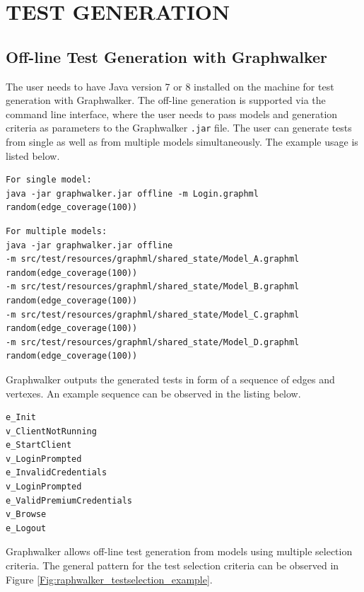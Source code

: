 \chapter{TEST GENERATION}
\label{chapter:test_generation}

\section{Off-line Test Generation with Graphwalker}
\par
The user needs to have Java version 7 or 8 installed on the machine for test generation with Graphwalker. The off-line generation is supported via the command line interface, where the user needs to pass models and generation criteria as parameters to the Graphwalker \texttt{.jar} file. The user can generate tests from single as well as from multiple models simultaneously. The example usage is listed below.

\begin{lstlisting}
For single model:
java -jar graphwalker.jar offline -m Login.graphml random(edge_coverage(100))
\end{lstlisting}
\begin{lstlisting}
For multiple models:
java -jar graphwalker.jar offline 
-m src/test/resources/graphml/shared_state/Model_A.graphml random(edge_coverage(100)) 
-m src/test/resources/graphml/shared_state/Model_B.graphml random(edge_coverage(100))
-m src/test/resources/graphml/shared_state/Model_C.graphml random(edge_coverage(100))
-m src/test/resources/graphml/shared_state/Model_D.graphml random(edge_coverage(100))
\end{lstlisting}

\par
Graphwalker outputs the generated tests in form of a sequence of edges and vertexes. An example sequence can be observed in the listing below.

\begin{lstlisting}
e_Init
v_ClientNotRunning
e_StartClient
v_LoginPrompted
e_InvalidCredentials
v_LoginPrompted
e_ValidPremiumCredentials
v_Browse
e_Logout
\end{lstlisting}

\par
Graphwalker allows off-line test generation from models using multiple selection criteria. The general pattern for the test selection criteria can be observed in Figure \ref{Fig:raphwalker_testselection_example}.

